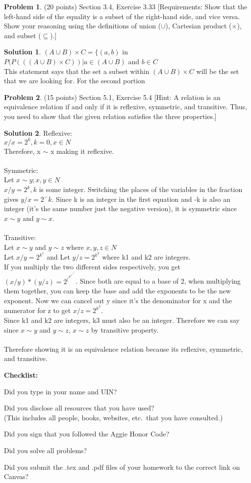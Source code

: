\documentclass{article}
\theoremstyle{definition}
\newtheorem{problem}{Problem}
\newtheorem*{solution}{Solution}
\newcommand{\checklist}{\noindent\textbf{Checklist:}
\begin{compactitem}[$\Box$] 
\item Did you type in your name and UIN? 
\item Did you disclose all resources that you have used? \\
(This includes all people, books, websites, etc.\ that you have consulted.)
\item Did you sign that you followed the Aggie Honor Code? 
\item Did you solve all problems? 
\item Did you submit the .tex and .pdf files of your homework to the correct link on Canvas? 
\end{compactitem}
}
\begin{document}
\begin{problem} (20 points) Section 3.4, Exercise 3.33
[Requirements: Show that the left-hand side of the equality is a subset of the right-hand 
side, and vice versa.  Show your reasoning using the definitions of union ($\cup$), 
Cartesian product ($\times$), and subset ($\subseteq$).]
\end{problem}
\begin{solution} 
$(A \cup B) \times C = \{(a, b)$ in $P(P(((A \cup B) \times C)) | a \in (A \cup B)$ and $b \in C$ \\
This statement says that the set a subset within $(A \cup B) \times C$ will be the set that we are looking for. For the second portion
\end{solution}

\begin{problem} (15 points) Section 5.1, Exercise 5.4
[Hint: A relation is an equivalence relation if and only if it is reflexive, symmetric, and
transitive.  Thus, you need to show that the given relation satisfies the three properties.]
\end{problem}
\begin{solution} 
Reflexive: \\
$x/x = 2^k, k = 0, x \in N $\\
Therefore, x $\sim$ x making it reflexive. \\
\\
Symmetric: \\
Let $x \sim y; x, y \in N$ \\
$x / y = 2^k, k$ is some integer. Switching the places of the variables in the fraction gives $y / x = 2^-k$. Since k is an integer in the first equation and -k is also an integer (it's the same number just the negative version), it is symmetric since $x \sim y$ and $y \sim x$. \\
\\
Transitive: \\
Let $x \sim y$ and $y \sim z$ where $x, y, z \in N$ \\
Let $x / y = 2^k^1$ and Let $y / z = 2^k^2$ where k1 and k2 are integers. \\
If you multiply the two different sides respectively, you get $(x / y) * (y / z) = 2^(^k^1 ^+ ^k^2^)$. Since both are equal to a base of 2, when multiplying them together, you can keep the base and add the exponents to be the new exponent. Now we can cancel out y since it's the denominator for x and the numerator for z to get $x / z = 2^k^3$. \\
Since k1 and k2 are integers, k3 must also be an integer.
Therefore we can say since $x \sim y$ and $y \sim z$, $x \sim z$ by transitive property.\\
\\
Therefore showing it is an equivalence relation because its reflexive, symmetric, and transitive.

\end{solution}

\goodbreak
\checklist
\end{document}
